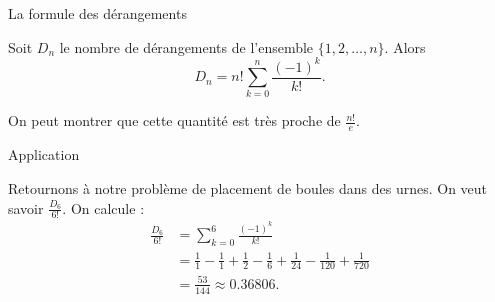 \documentclass[nuit,charter,pied]{BeamerJS}
\begin{document}
\begin{frame}{La formule des dérangements}
\pause
\begin{thm}
Soit \(D_n\) le nombre de dérangements de l'ensemble \(\{1,2,\ldots,n\}\). Alors
\[D_n=n!\sum_{k=0}^n\frac{(-1)^k}{k!}.\]
\end{thm}
\pause
\begin{lumiere}
On peut montrer que cette quantité est très proche de \(\frac{n!}{e}\).
\end{lumiere}
\end{frame}
\begin{frame}{Application}
\pause
\begin{ex}
Retournons à notre problème de placement de boules dans des urnes. On veut savoir \(\frac{D_6}{6!}.\) On calcule :
\begin{align*}
\frac{D_6}{6!}&=\sum_{k=0}^6\frac{(-1)^k}{k!}\\
&=\frac{1}{1}-\frac{1}{1}+\frac{1}{2}-\frac{1}{6}+\frac{1}{24}-\frac{1}{120}+\frac{1}{720}\\
&=\frac{53}{144}\approx\num{0.36806}.
\end{align*}
\end{ex}
\end{frame}
\end{document}

